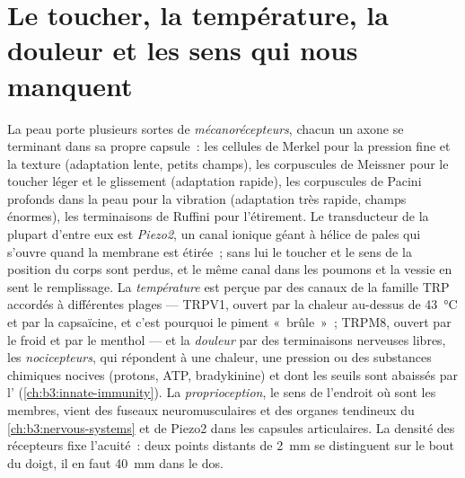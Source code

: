 \section{Le toucher, la température, la douleur et les sens qui nous manquent}

\begin{definition}[La somesthésie]\label{def:b3:sensory-systems:somato}
La peau porte plusieurs sortes de \emph{mécanorécepteurs}, chacun un
axone se terminant dans sa propre capsule~: les cellules de Merkel pour
la pression fine et la texture (adaptation lente, petits champs), les
corpuscules de Meissner pour le toucher léger et le glissement
(adaptation rapide), les corpuscules de Pacini profonds dans la peau
pour la vibration (adaptation très rapide, champs énormes), les
terminaisons de Ruffini pour l'étirement. Le transducteur de la plupart
d'entre eux est \emph{Piezo2}, un canal ionique géant à hélice de pales
qui s'ouvre quand la membrane est étirée~; sans lui le toucher et le
sens de la position du corps sont perdus, et le même canal dans les
poumons et la vessie en sent le remplissage. La \emph{température} est
perçue par des canaux de la famille TRP accordés à différentes plages
--- TRPV1, ouvert par la chaleur au-dessus de \qty{43}{\celsius} et par
la capsaïcine, et c'est pourquoi le piment «~brûle~»~; TRPM8, ouvert par
le froid et par le menthol --- et la \emph{douleur} par des
terminaisons nerveuses libres, les \emph{nocicepteurs}, qui répondent à
une chaleur, une pression ou des substances chimiques nocives (protons,
ATP, bradykinine) et dont les seuils sont abaissés par l'
(\cref{ch:b3:innate-immunity}). La \emph{proprioception}, le sens de
l'endroit où sont les membres, vient des fuseaux neuromusculaires et des
organes tendineux du \cref{ch:b3:nervous-systems} et de Piezo2 dans les
capsules articulaires. La densité des récepteurs fixe l'acuité~: deux
points distants de \qty{2}{mm} se distinguent sur le bout du doigt, il
en faut \qty{40}{mm} dans le dos.
\end{definition}

